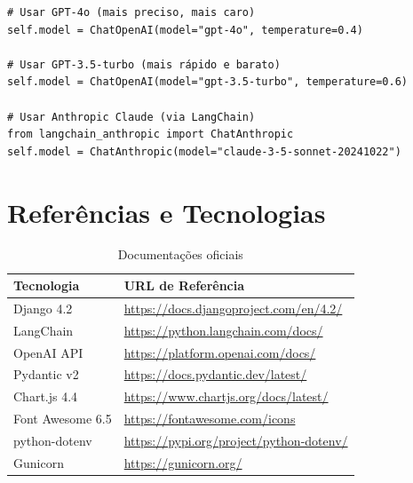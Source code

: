 \documentclass[12pt, a4paper, oneside]{report}
\begin{document}
\begin{lstlisting}[style=python, caption={Trocar modelo em qualquer agente}]
# Usar GPT-4o (mais preciso, mais caro)
self.model = ChatOpenAI(model="gpt-4o", temperature=0.4)

# Usar GPT-3.5-turbo (mais rápido e barato)
self.model = ChatOpenAI(model="gpt-3.5-turbo", temperature=0.6)

# Usar Anthropic Claude (via LangChain)
from langchain_anthropic import ChatAnthropic
self.model = ChatAnthropic(model="claude-3-5-sonnet-20241022")
\end{lstlisting}

\chapter{Referências e Tecnologias}

\begin{table}[H]
\centering
\caption{Documentações oficiais}
\begin{tabularx}{\textwidth}{l X}
\toprule
Tecnologia & URL de Referência \\
\midrule
Django 4.2 & \url{https://docs.djangoproject.com/en/4.2/} \\
LangChain & \url{https://python.langchain.com/docs/} \\
OpenAI API & \url{https://platform.openai.com/docs/} \\
Pydantic v2 & \url{https://docs.pydantic.dev/latest/} \\
Chart.js 4.4 & \url{https://www.chartjs.org/docs/latest/} \\
Font Awesome 6.5 & \url{https://fontawesome.com/icons} \\
python-dotenv & \url{https://pypi.org/project/python-dotenv/} \\
Gunicorn & \url{https://gunicorn.org/} \\
\bottomrule
\end{tabularx}
\end{table}

\clearpage
\thispagestyle{empty}

\end{document}
